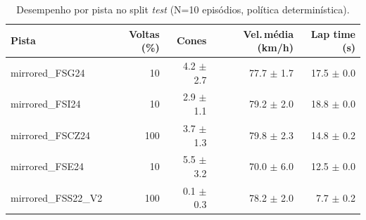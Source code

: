 \begin{table}[H]
\centering
\caption{Desempenho por pista no split \textit{test} (N=10 episódios, política determinística).}
\label{tab:per_track_test}
\begin{tabular}{lrrrr}
\toprule
\textbf{Pista} & \textbf{Voltas (\%)} & \textbf{Cones} & \textbf{Vel.\,m\'edia (km/h)} & \textbf{Lap time (s)} \\
\midrule
mirrored_FSG24 & 10 & 4.2 $\pm$ 2.7 & 77.7 $\pm$ 1.7 & 17.5 $\pm$ 0.0 \\
mirrored_FSI24 & 10 & 2.9 $\pm$ 1.1 & 79.2 $\pm$ 2.0 & 18.8 $\pm$ 0.0 \\
mirrored_FSCZ24 & 100 & 3.7 $\pm$ 1.3 & 79.8 $\pm$ 2.3 & 14.8 $\pm$ 0.2 \\
mirrored_FSE24 & 10 & 5.5 $\pm$ 3.2 & 70.0 $\pm$ 6.0 & 12.5 $\pm$ 0.0 \\
mirrored_FSS22_V2 & 100 & 0.1 $\pm$ 0.3 & 78.2 $\pm$ 2.0 & 7.7 $\pm$ 0.2 \\
\bottomrule
\end{tabular}
\end{table}
